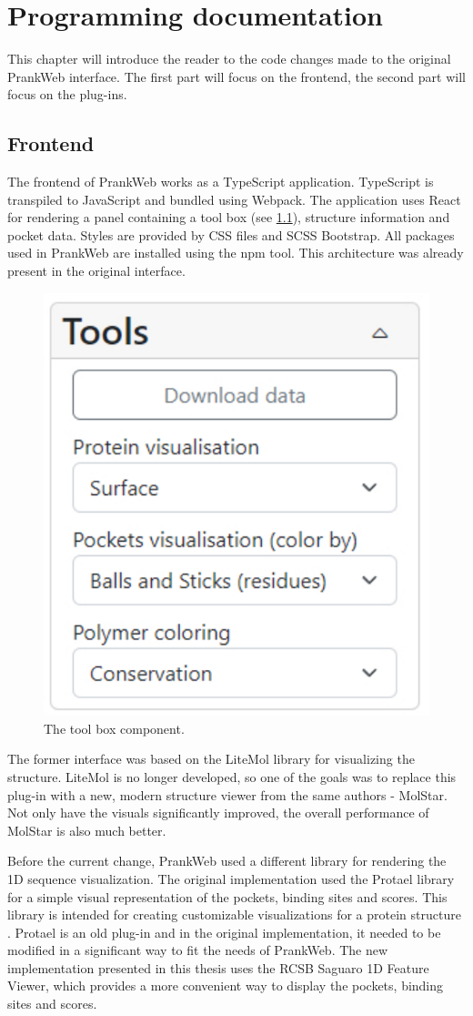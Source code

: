 \chapter{Programming documentation}
\label{chap:prog_docs}

This chapter will introduce the reader to the code changes made to the original PrankWeb interface. The first part will focus on the frontend, the second part will focus on the plug-ins.

\section{Frontend}
\label{sec:frontend}

The frontend of PrankWeb works as a TypeScript application. TypeScript is transpiled to JavaScript and bundled using Webpack. The application uses React for rendering a panel containing a tool box (see \cref{fig:toolbox}), structure information and pocket data. Styles are provided by CSS files and SCSS Bootstrap. All packages used in PrankWeb are installed using the npm tool. This architecture was already present in the original interface.

\begin{figure}[ht]
    \centering
    \includegraphics[width=0.4\linewidth]{img/toolsbox.pdf}
    \caption{The tool box component.}
    \label{fig:toolbox}
\end{figure}

The former interface was based on the LiteMol library for visualizing the structure. LiteMol is no longer developed, so one of the goals was to replace this plug-in with a new, modern structure viewer from the same authors - MolStar. Not only have the visuals significantly improved, the overall performance of MolStar is also much better. \cite{10.1093/nar/gkab314}

Before the current change, PrankWeb used a different library for rendering the 1D sequence visualization. The original implementation used the Protael library for a simple visual representation of the pockets, binding sites and scores. This library is intended for creating customizable visualizations for a protein structure \cite{10.1093/bioinformatics/btv605}. Protael is an old plug-in and in the original implementation, it needed to be modified in a significant way to fit the needs of PrankWeb. The new implementation presented in this thesis uses the RCSB Saguaro 1D Feature Viewer, which provides a more convenient way to display the pockets, binding sites and scores.

